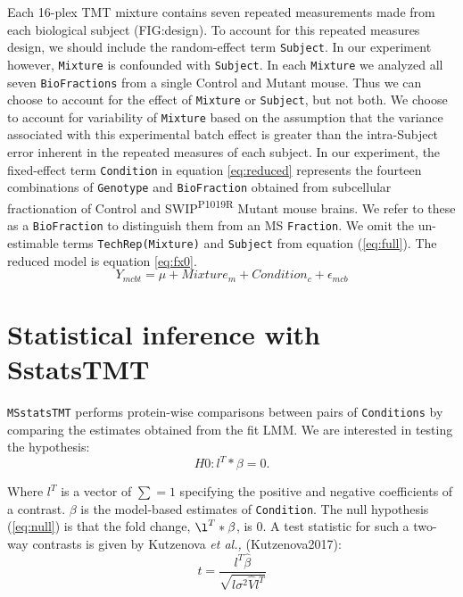 \documentclass[11pt]{elife}\usepackage[]{graphicx}\usepackage[]{color}
\begin{document}
Each 16-plex TMT mixture contains seven repeated measurements made from each
biological subject (FIG:design).  To account for this repeated measures
design, we should include the random-effect term \texttt{Subject}.
In our experiment however, \texttt{Mixture} is confounded with \texttt{Subject}.
In each \texttt{Mixture} we analyzed all seven \texttt{BioFractions} from a
single Control and Mutant mouse. Thus we can choose to
account for the effect of \texttt{Mixture} or \texttt{Subject}, but not both. We
choose to account for variability of \texttt{Mixture} based on the assumption
that the variance associated with this experimental batch effect is greater than
the intra-Subject error inherent in the repeated measures of each subject.
In our experiment, the fixed-effect term \texttt{Condition} in equation
\ref{eq:reduced} represents the fourteen combinations of \texttt{Genotype} and
\texttt{BioFraction} obtained from subcellular fractionation of Control and
SWIP\textsuperscript{P1019R} Mutant mouse brains. We refer to these as a
\texttt{BioFraction} to distinguish them from an MS \texttt{Fraction}. 
We omit the un-estimable terms \texttt{TechRep(Mixture)} and \texttt{Subject}
from equation (\ref{eq:full}). The reduced model is equation \ref{eq:fx0}.
\begin{equation}
	\label{eq:fx0}
	Y_{mcbt} = \mu + Mixture_m + Condition_c + \epsilon_{mcb}
\end{equation}


\section{Statistical inference with SstatsTMT}

\texttt{MSstatsTMT} performs protein-wise comparisons between pairs of 
\texttt{Conditions} by comparing the estimates obtained from the fit LMM. 
We are interested in testing the hypothesis:
\begin{equation}
	\label{eq:null} %
	H0 : l^T * \beta = 0. 
\end{equation}

Where $l^T$ is a vector of $\sum=1$ specifying the positive and negative
coefficients of a contrast. $\beta$ is the model-based estimates of
\texttt{Condition}.  The null hypothesis (\ref{eq:null}) is that the fold
change, $\l^T * \beta$, is 0.  A test statistic for such a two-way contrasts is
given by Kutzenova \textit{et al.,} (Kutzenova2017):
\begin{equation} 
	\label{eq:tstatistic} %
	t = \frac{l^T \hat{\beta}}{\sqrt{l \sigma^2 \hat{V} l^T}}
\end{equation}
\end{document}

